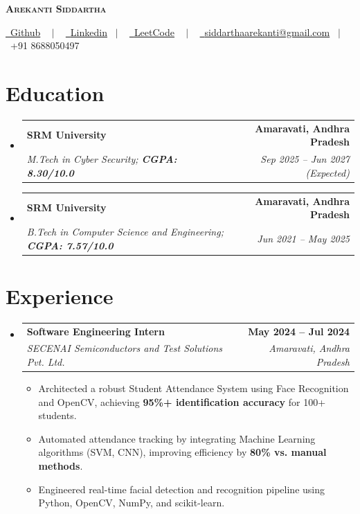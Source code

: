 \documentclass[letterpaper,11pt]{article}
\makeatletter
\newcommand{\resumeItem}[1]{
  \item\small{
    {#1 \vspace{-2pt}}
  }
}
\newcommand{\resumeSubheading}[4]{
  \vspace{-2pt}\item
    \begin{tabular*}{1.0\textwidth}[t]{l@{\extracolsep{\fill}}r}
      \textbf{#1} & \textbf{\small #2} \\
      \textit{\small#3} & \textit{\small #4} \\
    \end{tabular*}\vspace{-7pt}
}
\newcommand{\resumeSubHeadingListStart}{\begin{itemize}[leftmargin=0.0in, label={}]}
\newcommand{\resumeSubHeadingListEnd}{\end{itemize}}
\newcommand{\resumeItemListStart}{\begin{itemize}}
\newcommand{\resumeItemListEnd}{\end{itemize}\vspace{-5pt}}
\makeatother
\begin{document}
\begin{center}

    \textbf{\Huge \scshape Arekanti Siddartha} \\ \vspace{-11pt} 
    
    \vspace{20pt}


    \href{https://github.com/Siddartharekanti}{\raisebox{0\height}\faGithub\ {Github}}
    ~ $|$ ~ 
    \href{https://www.linkedin.com/in/siddartha-arekanti-05557b24b/}{\raisebox{0\height}\faLinkedin\ {Linkedin}}~ $|$ ~ 
        \href{https://leetcode.com/u/Siddartha_A/}{\raisebox{0\height}\faCode\ {LeetCode}} ~ $|$ ~
    \href{mailto:siddarthaarekanti@gmail.com}{\raisebox{-0.1\height}\faEnvelope\  {siddarthaarekanti@gmail.com}}~ $|$ ~ 
    \small \raisebox{-0.01\height}\faPhone\ +91 8688050497
    
    \vspace{-8pt}
\end{center}

\section{Education}
  \resumeSubHeadingListStart
    \resumeSubheading
      {SRM University}{Amaravati, Andhra Pradesh}
      {M.Tech in Cyber Security; \textbf{CGPA: 8.30/10.0}}{Sep 2025 -- Jun 2027 (Expected)}
    \resumeSubheading
      {SRM University}{Amaravati, Andhra Pradesh}
      {B.Tech in Computer Science and Engineering; \textbf{CGPA: 7.57/10.0}}{Jun 2021 -- May 2025}
  \resumeSubHeadingListEnd
\vspace{-15pt}

\section{Experience}
  \resumeSubHeadingListStart
    \resumeSubheading
      {Software Engineering Intern}{May 2024 -- Jul 2024}
      {SECENAI Semiconductors and Test Solutions Pvt. Ltd.}{Amaravati, Andhra Pradesh}
      \resumeItemListStart
        \resumeItem{Architected a robust Student Attendance System using Face Recognition and OpenCV, achieving \textbf{95\%+ identification accuracy} for 100+ students.}
        \resumeItem{Automated attendance tracking by integrating Machine Learning algorithms (SVM, CNN), improving efficiency by \textbf{80\% vs. manual methods}.}
        \resumeItem{Engineered real-time facial detection and recognition pipeline using Python, OpenCV, NumPy, and scikit-learn.}
      \resumeItemListEnd
  \resumeSubHeadingListEnd
\vspace{-15pt}
\end{document}
